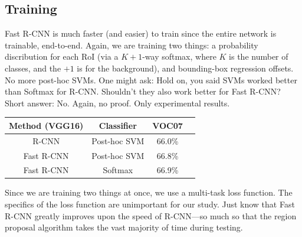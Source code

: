 \documentclass{article}
\begin{document}
\subsection{Training}
Fast R-CNN is much faster (and easier) to train since the entire network is trainable, end-to-end. Again, we are training two things: a probability discribution for each RoI (via a $K+1$-way softmax, where $K$ is the number of classes, and the $+1$ is for the background), and bounding-box regression offsets. No more post-hoc SVMs. One might ask: Hold on, you said SVMs worked better than Softmax for R-CNN. Shouldn't they also work better for Fast R-CNN? Short answer: No. Again, no proof. Only experimental results.

\begin{center}
 \begin{tabular}{c c c c} 
 \hline
 Method (VGG16) & Classifier & VOC07 \\ [0.5ex] 
 \hline
 R-CNN & Post-hoc SVM & 66.0\% \\
 Fast R-CNN & Post-hoc SVM & 66.8\% \\
 Fast R-CNN & Softmax & 66.9\% \\
 \hline
\end{tabular}
\end{center}

Since we are training two things at once, we use a multi-task loss function. The specifics of the loss function are unimportant for our study. Just know that Fast R-CNN greatly improves upon the speed of R-CNN---so much so that the region proposal algorithm takes the vast majority of time during testing.
\end{document}
